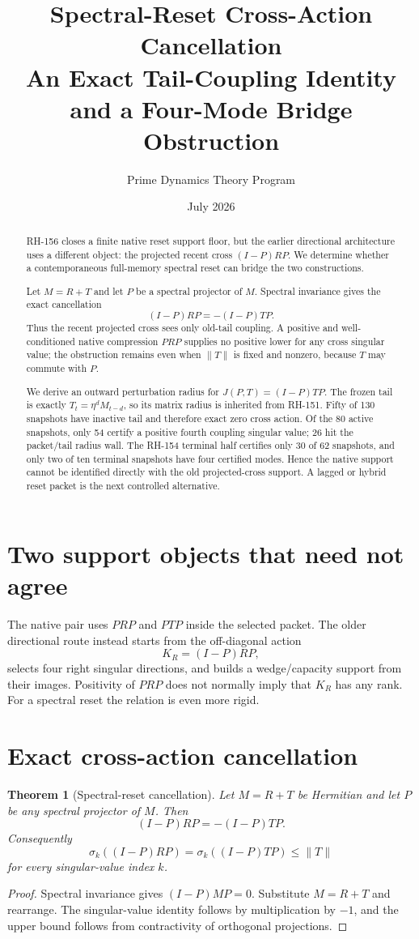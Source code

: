 \documentclass[12pt]{article}
\title{Spectral-Reset Cross-Action Cancellation\\\large An Exact Tail-Coupling Identity and a Four-Mode Bridge Obstruction}
\author{Prime Dynamics Theory Program}
\date{July 2026}
\newtheorem{theorem}{Theorem}
\begin{document}
\maketitle

\begin{abstract}
RH-156 closes a finite native reset support floor, but the earlier
directional architecture uses a different object: the projected recent cross
$(I-P)RP$.  We determine whether a contemporaneous full-memory spectral reset
can bridge the two constructions.

Let $M=R+T$ and let $P$ be a spectral projector of $M$.  Spectral invariance
gives the exact cancellation
\[
 (I-P)RP=-(I-P)TP.
\]
Thus the recent projected cross sees only old-tail coupling.  A positive and
well-conditioned native compression $PRP$ supplies no positive lower for any
cross singular value; the obstruction remains even when $\|T\|$ is fixed and
nonzero, because $T$ may commute with $P$.

We derive an outward perturbation radius for
$J(P,T)=(I-P)TP$.  The frozen tail is exactly
$T_t=\eta^dM_{t-d}$, so its matrix radius is inherited from RH-151.  Fifty of
130 snapshots have inactive tail and therefore exact zero cross action.  Of
the 80 active snapshots, only 54 certify a positive fourth coupling singular
value; 26 hit the packet/tail radius wall.  The RH-154 terminal half certifies
only 30 of 62 snapshots, and only two of ten terminal snapshots have four
certified modes.  Hence the native support cannot be identified directly
with the old projected-cross support.  A lagged or hybrid reset packet is the
next controlled alternative.
\end{abstract}

\section{Two support objects that need not agree}
The native pair uses $PRP$ and $PTP$ inside the selected packet.  The older
directional route instead starts from the off-diagonal action
\[
 K_R=(I-P)RP,
\]
selects four right singular directions, and builds a wedge/capacity support
from their images.  Positivity of $PRP$ does not normally imply that $K_R$
has any rank.  For a spectral reset the relation is even more rigid.

\section{Exact cross-action cancellation}
\begin{theorem}[Spectral-reset cancellation]\label{thm:cancel}
Let $M=R+T$ be Hermitian and let $P$ be any spectral projector of $M$.  Then
\[
 (I-P)RP=-(I-P)TP.
\]
Consequently
\[
 \sigma_k((I-P)RP)=\sigma_k((I-P)TP)\leq\|T\|
\]
for every singular-value index $k$.
\end{theorem}
\begin{proof}
Spectral invariance gives $(I-P)MP=0$.  Substitute $M=R+T$ and rearrange.
The singular-value identity follows by multiplication by $-1$, and the upper
bound follows from contractivity of orthogonal projections.
\end{proof}
\end{document}
